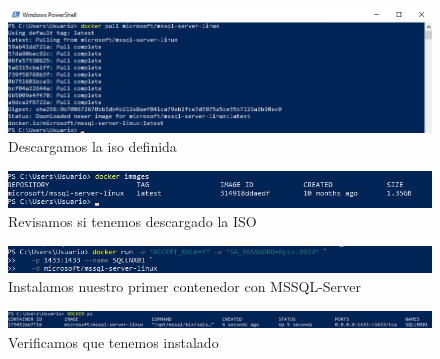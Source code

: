\documentclass[preprint,12pt]{elsarticle}
\begin{document}
\begin{figure}[H]
	\begin{center}
		\includegraphics[width=12cm]{./IMAGENES/foto8} 
		\caption{Descargamos la iso definida}
	\end{center}
\end{figure}

\begin{figure}[H]
	\begin{center}
		\includegraphics[width=12cm]{./IMAGENES/foto9} 
		\caption{Revisamos si tenemos descargado la ISO}
	\end{center}
\end{figure}

\begin{figure}[H]
	\begin{center}
		\includegraphics[width=12cm]{./IMAGENES/foto10} 
		\caption{Instalamos nuestro primer contenedor con MSSQL-Server}
	\end{center}
\end{figure}

\begin{figure}[H]
	\begin{center}
		\includegraphics[width=12cm]{./IMAGENES/foto11} 
		\caption{Verificamos que tenemos instalado}
	\end{center}
\end{figure}
\end{document}
